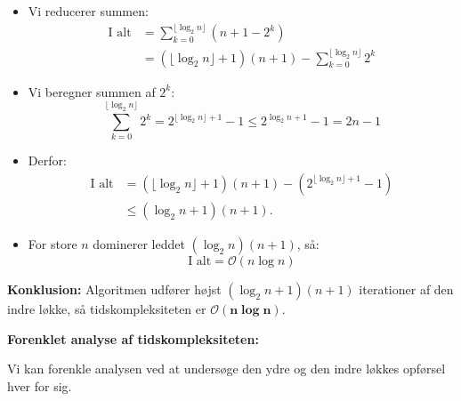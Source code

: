 \begin{example}
\begin{itemize}
\begin{itemize}
\[            \]
            \item Vi reducerer summen:
            \[
            \begin{aligned}
            \text{I alt} &= \sum_{k=0}^{\lfloor \log_2 n \rfloor} (n + 1 - 2^k) \\
            &= (\lfloor \log_2 n \rfloor + 1)(n + 1) - \sum_{k=0}^{\lfloor \log_2 n \rfloor} 2^k
            \end{aligned}
            \]
            \item Vi beregner summen af $2^k$:
            \[
            \sum_{k=0}^{\lfloor \log_2 n \rfloor} 2^k = 2^{\lfloor \log_2 n \rfloor + 1} - 1 \leq 2^{\log_2 n + 1} - 1 = 2n -1
            \]
            \item Derfor:
            \[
            \begin{aligned}
            \text{I alt} &= (\lfloor\log_2 n\rfloor+1)(n+1) - (2^{\lfloor\log_2 n\rfloor+1}-1) \\
            &\leq (\log_2 n+1)(n+1).
            \end{aligned}
            \]
            \item For store $n$ dominerer leddet $(\log_2 n)(n +1)$, så:
            \[
            \text{I alt} = \mathcal{O}(n \log n)
            \]
        \end{itemize}
    \end{itemize}
    
    \textbf{Konklusion:} Algoritmen udfører højst $(\log_2 n+1)(n+1)$ iterationer af den indre løkke, så tidskompleksiteten er $\boldsymbol{\mathcal{O}(n \log n)}$.

    \textbf{Forenklet analyse af tidskompleksiteten:}

    Vi kan forenkle analysen ved at undersøge den ydre og den indre løkkes opførsel hver for sig.


\end{example}
